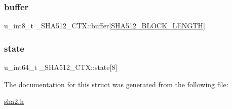 \subsubsection{\texorpdfstring{buffer}{buffer}}
{\footnotesize\ttfamily u\+\_\+int8\+\_\+t \+\_\+\+S\+H\+A512\+\_\+\+C\+T\+X\+::buffer\mbox{[}\mbox{\hyperlink{sha2_8h_a768752124501032a219d4426b2ce3197}{S\+H\+A512\+\_\+\+B\+L\+O\+C\+K\+\_\+\+L\+E\+N\+G\+TH}}\mbox{]}}

\mbox{\label{struct__SHA512__CTX_ad50dd340342510780b1f8d4815df4886}} 
\subsubsection{\texorpdfstring{state}{state}}
{\footnotesize\ttfamily u\+\_\+int64\+\_\+t \+\_\+\+S\+H\+A512\+\_\+\+C\+T\+X\+::state\mbox{[}8\mbox{]}}



The documentation for this struct was generated from the following file\+:\begin{DoxyCompactItemize}
\item 
\mbox{\hyperlink{sha2_8h}{sha2.\+h}}\end{DoxyCompactItemize}
